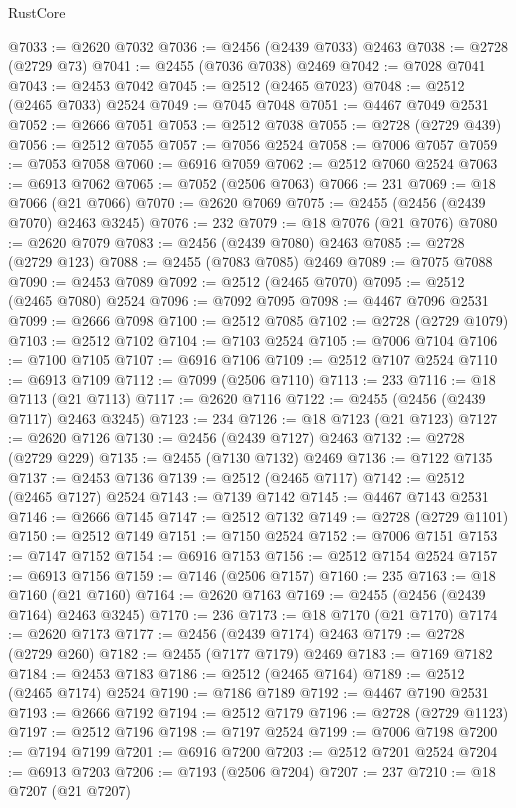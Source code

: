 \begin{lexlean}{RustCore}
\begin{coremodule}
@7033 := @2620 @7032
@7036 := @2456 (@2439 @7033) @2463
@7038 := @2728 (@2729 @73)
@7041 := @2455 (@7036 @7038) @2469
@7042 := @7028 @7041
@7043 := @2453 @7042
@7045 := @2512 (@2465 @7023)
@7048 := @2512 (@2465 @7033) @2524
@7049 := @7045 @7048
@7051 := @4467 @7049 @2531
@7052 := @2666 @7051
@7053 := @2512 @7038
@7055 := @2728 (@2729 @439)
@7056 := @2512 @7055
@7057 := @7056 @2524
@7058 := @7006 @7057
@7059 := @7053 @7058
@7060 := @6916 @7059
@7062 := @2512 @7060 @2524
@7063 := @6913 @7062
@7065 := @7052 (@2506 @7063)
@7066 := 231
@7069 := @18 @7066 (@21 @7066)
@7070 := @2620 @7069
@7075 := @2455 (@2456 (@2439 @7070) @2463 @3245)
@7076 := 232
@7079 := @18 @7076 (@21 @7076)
@7080 := @2620 @7079
@7083 := @2456 (@2439 @7080) @2463
@7085 := @2728 (@2729 @123)
@7088 := @2455 (@7083 @7085) @2469
@7089 := @7075 @7088
@7090 := @2453 @7089
@7092 := @2512 (@2465 @7070)
@7095 := @2512 (@2465 @7080) @2524
@7096 := @7092 @7095
@7098 := @4467 @7096 @2531
@7099 := @2666 @7098
@7100 := @2512 @7085
@7102 := @2728 (@2729 @1079)
@7103 := @2512 @7102
@7104 := @7103 @2524
@7105 := @7006 @7104
@7106 := @7100 @7105
@7107 := @6916 @7106
@7109 := @2512 @7107 @2524
@7110 := @6913 @7109
@7112 := @7099 (@2506 @7110)
@7113 := 233
@7116 := @18 @7113 (@21 @7113)
@7117 := @2620 @7116
@7122 := @2455 (@2456 (@2439 @7117) @2463 @3245)
@7123 := 234
@7126 := @18 @7123 (@21 @7123)
@7127 := @2620 @7126
@7130 := @2456 (@2439 @7127) @2463
@7132 := @2728 (@2729 @229)
@7135 := @2455 (@7130 @7132) @2469
@7136 := @7122 @7135
@7137 := @2453 @7136
@7139 := @2512 (@2465 @7117)
@7142 := @2512 (@2465 @7127) @2524
@7143 := @7139 @7142
@7145 := @4467 @7143 @2531
@7146 := @2666 @7145
@7147 := @2512 @7132
@7149 := @2728 (@2729 @1101)
@7150 := @2512 @7149
@7151 := @7150 @2524
@7152 := @7006 @7151
@7153 := @7147 @7152
@7154 := @6916 @7153
@7156 := @2512 @7154 @2524
@7157 := @6913 @7156
@7159 := @7146 (@2506 @7157)
@7160 := 235
@7163 := @18 @7160 (@21 @7160)
@7164 := @2620 @7163
@7169 := @2455 (@2456 (@2439 @7164) @2463 @3245)
@7170 := 236
@7173 := @18 @7170 (@21 @7170)
@7174 := @2620 @7173
@7177 := @2456 (@2439 @7174) @2463
@7179 := @2728 (@2729 @260)
@7182 := @2455 (@7177 @7179) @2469
@7183 := @7169 @7182
@7184 := @2453 @7183
@7186 := @2512 (@2465 @7164)
@7189 := @2512 (@2465 @7174) @2524
@7190 := @7186 @7189
@7192 := @4467 @7190 @2531
@7193 := @2666 @7192
@7194 := @2512 @7179
@7196 := @2728 (@2729 @1123)
@7197 := @2512 @7196
@7198 := @7197 @2524
@7199 := @7006 @7198
@7200 := @7194 @7199
@7201 := @6916 @7200
@7203 := @2512 @7201 @2524
@7204 := @6913 @7203
@7206 := @7193 (@2506 @7204)
@7207 := 237
@7210 := @18 @7207 (@21 @7207)

\end{coremodule}
\end{lexlean}
